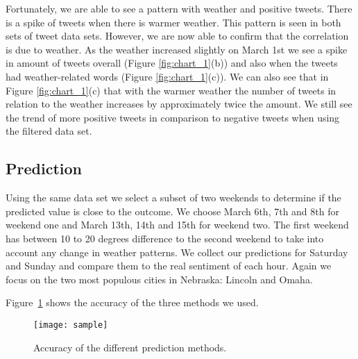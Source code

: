 Fortunately, we are able to see a pattern with weather and positive tweets. There is a spike of tweets when there is warmer weather. This pattern is seen in both sets of tweet data sets. However, we are now able to confirm that the correlation is due to weather. As the weather increased slightly on March 1st we see a spike in amount of tweets overall (Figure \ref{fig:chart_1}(b)) and also when the tweets had weather-related words (Figure \ref{fig:chart_1}(c)). We can also see that in Figure \ref{fig:chart_1}(c) that with the warmer weather the number of tweets in relation to the weather increases by approximately twice the amount. We still see the trend of more positive tweets in comparison to negative tweets when using the filtered data set.


\subsection{Prediction}

Using the same data set we select a subset of two weekends to determine if the predicted value is close to the outcome. We choose March 6th, 7th and 8th for weekend one and March 13th, 14th and 15th for weekend two. The first weekend has between 10 to 20 degrees difference to the second weekend to take into account any change in weather patterns. We collect our predictions for Saturday and Sunday and compare them to the real sentiment of each hour. Again we focus on the two most populous cities in Nebraska: Lincoln and Omaha.

Figure~\ref{fig:predict} shows the accuracy of the three methods we used.

\begin{figure}[t]
\begin{center}
\texttt{[image: sample]} 
\end{center}
\vspace{-.1in}
\caption{Accuracy of the different prediction methods.}
\label{fig:predict}
\end{figure}
